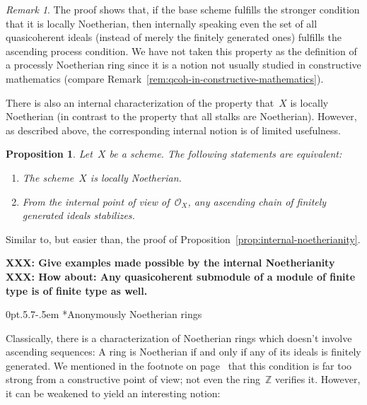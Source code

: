 \documentclass[10pt,reqno,a4paper]{amsbook}
\makeatletter
\theoremstyle{definition}
\theoremstyle{plain}
\newtheorem{prop}[defn]{Proposition}
\theoremstyle{remark}
\newtheorem{rem}[defn]{Remark}
\newcommand{\ZZ}{\mathbb{Z}}
\renewcommand{\O}{\mathcal{O}}
\newcommand{\?}{\,{:}\,}
\renewcommand{\_}{\mathpunct{.}\,}
\newcommand{\XXX}[1]{\textbf{XXX: #1}}
\renewenvironment{proof}[1][\proofname]{\par
  \pushQED{\qed}%
  \normalfont \topsep6\p@\@plus6\p@\relax
  \trivlist
  \item[\hskip\labelsep
        \itshape
    #1\@addpunct{.}]\ignorespaces
}{%
  \popQED\endtrivlist\@endpefalse
}
\def\subsection{\@startsection{subsection}{2}%
  {0pt}{.5\linespacing\@plus.7\linespacing}{-.5em}%
  {\normalfont\bfseries}}
\makeatother
\begin{document}
{\begin{rem}The proof shows that, if the base scheme fulfills the stronger
condition that it is locally Noetherian, then internally speaking even the set
of all quasicoherent ideals (instead of merely the finitely generated
ones) fulfills the ascending process condition. We have not taken this property
as the definition of a processly Noetherian ring since it is a notion not
usually studied in constructive mathematics (compare
Remark~\ref{rem:qcoh-in-constructive-mathematics}).
\end{rem}

There is also an internal characterization of the property that~$X$ is locally
Noetherian (in contrast to the property that all stalks are Noetherian).
However, as described above, the corresponding internal notion is of limited
usefulness.

\begin{prop}Let~$X$ be a scheme. The following statements are equivalent:
\begin{enumerate}
\item The scheme~$X$ is locally Noetherian.
\item From the internal point of view of~$\O_X$, any ascending chain of
finitely generated ideals stabilizes.
\end{enumerate}
\end{prop}

\begin{proof}Similar to, but easier than, the proof of
Proposition~\ref{prop:internal-noetherianity}.
\end{proof}

\XXX{Give examples made possible by the internal Noetherianity}
\XXX{How about: Any quasicoherent submodule of a module of finite type is of
finite type as well.}


\subsection*{Anonymously Noetherian rings}

Classically, there is a characterization of Noetherian rings which doesn't
involve ascending sequences: A ring is Noetherian if and only if any of its
ideals is finitely generated. We mentioned in the footnote on
page~\pageref{fn:z-principal-ideal-domain} that this condition is far too
strong from a constructive point of view; not even the ring~$\ZZ$ verifies it.
However, it can be weakened to yield an interesting notion:

}
\end{document}
